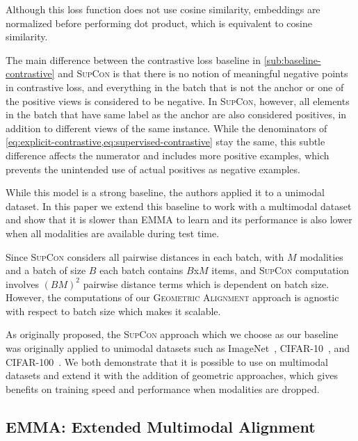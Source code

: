 \documentclass[10pt]{article} %
\newcommand{\ours}{\textsc{EMMA}}
\newcommand{\geom}{\textsc{Geometric Alignment}}
\newcommand{\supcon}{\textsc{SupCon}}
\begin{document}
Although this loss function does not use cosine similarity, embeddings are normalized before performing dot product, which is equivalent to cosine similarity.

The main difference between the contrastive loss baseline in \cref{sub:baseline-contrastive} and \supcon{} is that there is no notion of meaningful negative points in contrastive loss, and everything in the batch that is not the anchor or one of the positive views is considered to be negative. In \supcon{}, however, all elements in the batch that have same label as the anchor are also considered positives, in addition to different views of the same instance. While the denominators of \cref{eq:explicit-contrastive,eq:supervised-contrastive} stay the same, this subtle difference affects the numerator and includes more positive examples, which prevents the unintended use of actual positives as negative examples.

While this model is a strong baseline, the authors applied it to a unimodal dataset. In this paper we extend this baseline to work with a multimodal dataset and show that it is slower than \ours{} to learn and its performance is also lower when all modalities are available during test time.

Since \supcon{} considers all pairwise distances in each batch, with $M$ modalities and a batch of size $B$ each batch contains $B$x$M$ items, and \supcon{} computation involves $(BM)^2$ pairwise distance terms which is dependent on batch size. However, the computations of our \geom{} approach is agnostic with respect to batch size which makes it scalable.

As originally proposed, the \supcon{} approach which we choose as our baseline was originally applied to unimodal datasets such as ImageNet~\cite{imagenet2009}, CIFAR-10~\cite{krizhevsky2009learning}, and CIFAR-100~\cite{krizhevsky2009learning}. We both demonstrate that it is possible to use on multimodal datasets and extend it with the addition of geometric approaches, which gives benefits on training speed and performance when modalities are dropped.

\subsection{EMMA: Extended Multimodal Alignment}
\label{sec:emma}
\end{document}
